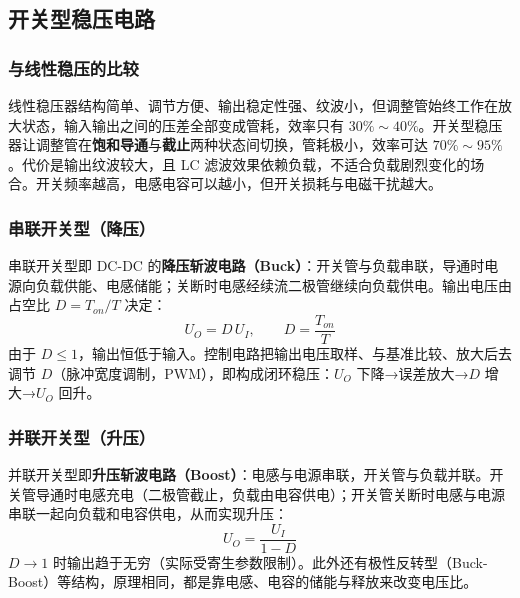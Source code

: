 \subsection{开关型稳压电路}
\subsubsection{与线性稳压的比较}
线性稳压器结构简单、调节方便、输出稳定性强、纹波小，但调整管始终工作在放大状态，输入输出之间的压差全部变成管耗，效率只有 $30\%\sim40\%$。开关型稳压器让调整管在\textbf{饱和导通}与\textbf{截止}两种状态间切换，管耗极小，效率可达 $70\%\sim95\%$。代价是输出纹波较大，且 LC 滤波效果依赖负载，不适合负载剧烈变化的场合。开关频率越高，电感电容可以越小，但开关损耗与电磁干扰越大。

\subsubsection{串联开关型（降压）}
串联开关型即 DC-DC 的\textbf{降压斩波电路（Buck）}：开关管与负载串联，导通时电源向负载供能、电感储能；关断时电感经续流二极管继续向负载供电。输出电压由占空比 $D=T_{on}/T$ 决定：
\begin{equation}
U_O=D\,U_I,\qquad D=\frac{T_{on}}{T}
\end{equation}
由于 $D\le1$，输出恒低于输入。控制电路把输出电压取样、与基准比较、放大后去调节 $D$（脉冲宽度调制，PWM），即构成闭环稳压：$U_O$ 下降→误差放大→$D$ 增大→$U_O$ 回升。

\subsubsection{并联开关型（升压）}
并联开关型即\textbf{升压斩波电路（Boost）}：电感与电源串联，开关管与负载并联。开关管导通时电感充电（二极管截止，负载由电容供电）；开关管关断时电感与电源串联一起向负载和电容供电，从而实现升压：
\begin{equation}
U_O=\frac{U_I}{1-D}
\end{equation}
$D\to1$ 时输出趋于无穷（实际受寄生参数限制）。此外还有极性反转型（Buck-Boost）等结构，原理相同，都是靠电感、电容的储能与释放来改变电压比。


